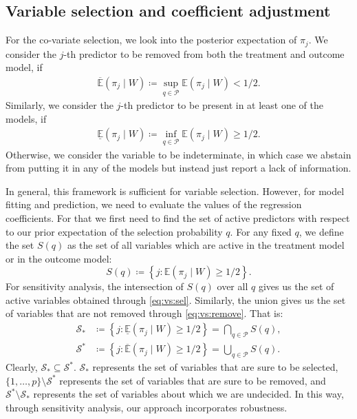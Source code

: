 \documentclass[preprint,12pt]{elsarticle}
\newcommand{\lexp}{\underline{\mathbb{E}}}
\newcommand{\uexp}{\overline{\mathbb{E}}}
\begin{document}
\subsection{Variable selection and coefficient adjustment}
For the co-variate selection, we look into the posterior expectation of $\pi_j$. 
We consider the $j$-th predictor to be removed from both the
treatment and outcome model, if
\begin{align}\label{eq:vs:remove}
	\uexp (\pi_j\mid W)\coloneqq \sup_{q\in \mathcal{P}} \mathbb{E}(\pi_j\mid W) < 1/2.
\end{align}
Similarly, we consider the $j$-th predictor to be present in at least one of the models, if
\begin{align}\label{eq:vs:sel}
	\lexp (\pi_j\mid W)\coloneqq \inf_{q\in \mathcal{P}} \mathbb{E}(\pi_j\mid W) \ge 1/2.
\end{align}
Otherwise, we consider the variable to be indeterminate,  in which case we abstain from putting
it in any of the models but instead just report a lack of information.

In general, this framework is
sufficient
for variable selection. However, for
model fitting and prediction, we need to evaluate the values 
of the regression coefficients. For that we first need to find the set of active
predictors with respect to our prior expectation of the selection probability $q$.
For any fixed $q$, we define the set $S(q)$ as the set of all variables which are active
in the treatment model or in the outcome model:
\begin{equation}
	S(q)\coloneqq
	\left\{j\colon \mathbb{E}(\pi_j\mid W) \ge 1/2\right\}.
\end{equation}
For sensitivity analysis,
the intersection of $S(q)$ over all $q$ gives us the set of
active variables obtained through \cref{eq:vs:sel}.
Similarly, the union gives us the set of
variables that are not removed through \cref{eq:vs:remove}.
That is:
\begin{align}
    \mathcal{S}_*&\coloneqq \left\{j:\lexp (\pi_j\mid W)\ge1/2\right\}
    = \bigcap_{q\in \mathcal{P}}S(q), \\
    \mathcal{S}^*&\coloneqq \left\{j:\uexp (\pi_j\mid W)\ge1/2\right\}
    = \bigcup_{q\in \mathcal{P}}S(q).
\end{align}
Clearly, $\mathcal{S}_*\subseteq\mathcal{S}^*$.
$\mathcal{S}_*$ represents the set of variables that are sure to be selected,
$\{1,\dots,p\}\setminus\mathcal{S}^*$ represents the set of variables that are sure to be removed, and
$\mathcal{S}^*\setminus\mathcal{S}_*$ represents the set of variables about which we are undecided.
In this way, through sensitivity analysis, our approach incorporates robustness.
\end{document}
